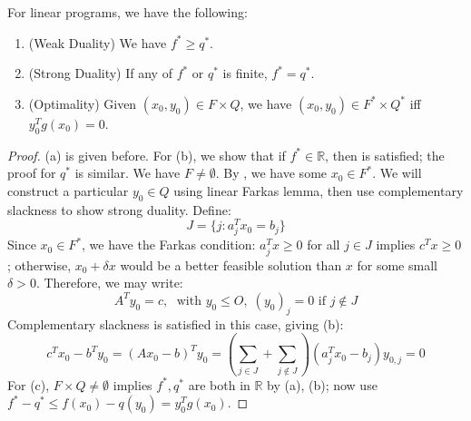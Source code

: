 \begin{prop}\label{prop:043-linear-strong-duality}For linear programs, we have the following:
	\begin{enumerate}[label=(\alph*)]
		\item (Weak Duality) We have $f^\ast\geq q^\ast$.
		\item (Strong Duality) If any of $f^\ast$ or $q^\ast$ is finite, $f^\ast=q^\ast$.
		\item (Optimality) Given $(x_0,y_0)\in F\times Q$, we have $(x_0,y_0)\in F^\ast\times Q^\ast$ iff $y_0^Tg(x_0)=0$.
	\end{enumerate}
\end{prop}

\begin{proof}
	(a) is given before. For (b), we show that if $f^\ast\in \mathbb{R}$, then  is satisfied; the proof for $q^\ast$ is similar. We have $F\neq \emptyset$. By , we have some $x_0\in F^\ast$. We will construct a particular $y_0\in Q$ using linear Farkas lemma, then use complementary slackness to show strong duality. Define:
	\[
		J=\{j:a_j^Tx_0=b_j\}
	\]
	Since $x_0\in F^\ast$, we have the Farkas condition: $a_j^Tx\geq 0$ for all $j\in J$ implies $c^Tx\geq 0$; otherwise, $x_0+\delta x$ would be a better feasible solution than $x$ for some small $\delta>0$. Therefore, we may write:
	\[
		A^Ty_0=c,\; \text{ with }y_0\leq O,\;(y_0)_j=0\text{ if }j\notin J
	\]
	Complementary slackness is satisfied in this case, giving (b):
	\[
		c^Tx_0-b^Ty_0=(Ax_0-b)^Ty_0=\left(\sum_{j\in J}+\sum_{j\notin J}\right)(a_j^Tx_0-b_j)y_{0,j}=0
	\]
	For (c), $F\times Q\neq\emptyset$ implies $f^\ast,q^\ast$ are both in $\mathbb{R}$ by (a), (b); now use $f^\ast-q^\ast\leq f(x_0)-q(y_0)=y_0^Tg(x_0)$.
\end{proof}

